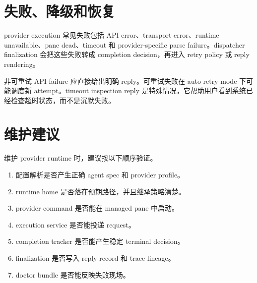 \section{失败、降级和恢复}

provider execution 常见失败包括 API error、transport error、runtime unavailable、pane dead、timeout 和 provider-specific parse failure。dispatcher finalization 会把这些失败转成 completion decision，再进入 retry policy 或 reply rendering。

非可重试 API failure 应直接给出明确 reply。可重试失败在 auto retry mode 下可能调度新 attempt。timeout inspection reply 是特殊情况，它帮助用户看到系统已经检查超时状态，而不是沉默失败。

\section{维护建议}

维护 provider runtime 时，建议按以下顺序验证。

\begin{enumerate}
  \item 配置解析是否产生正确 agent spec 和 provider profile。
  \item runtime home 是否落在预期路径，并且继承策略清楚。
  \item provider command 是否能在 managed pane 中启动。
  \item execution service 是否能投递 request。
  \item completion tracker 是否能产生稳定 terminal decision。
  \item finalization 是否写入 reply record 和 trace lineage。
  \item doctor bundle 是否能反映失败现场。
\end{enumerate}
